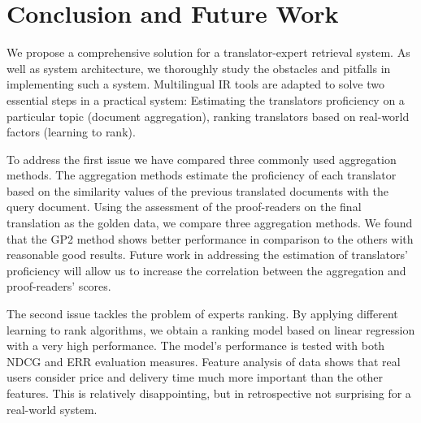 \section{Conclusion and Future Work}
\label{sec:conclusion}
We propose a comprehensive solution for a translator-expert retrieval system. As well as system architecture, we thoroughly study the obstacles and pitfalls in implementing such a system. Multilingual IR tools are adapted to solve two essential steps in a practical system: Estimating the translators proficiency on a particular topic (document aggregation), ranking translators based on real-world factors (learning to rank).  %

To address the first issue we have compared three commonly used aggregation methods. The aggregation methods estimate the proficiency of each translator based on the similarity values of the previous translated documents with the query document. Using the assessment of the proof-readers on the final translation as the golden data, we compare three aggregation methods. We found that the GP2 method shows better performance in comparison to the others with reasonable good results. Future work in addressing the estimation of translators' proficiency will allow us to increase the correlation between the aggregation and proof-readers' scores.

The second issue tackles the problem of experts ranking. By applying different learning to rank algorithms, we obtain a ranking model based on linear regression with a very high performance. The model's performance is tested with both NDCG and ERR evaluation measures. Feature analysis of data shows that real users consider  price and delivery time much more important than the other features. This is relatively disappointing, but in retrospective not surprising for a real-world system.


